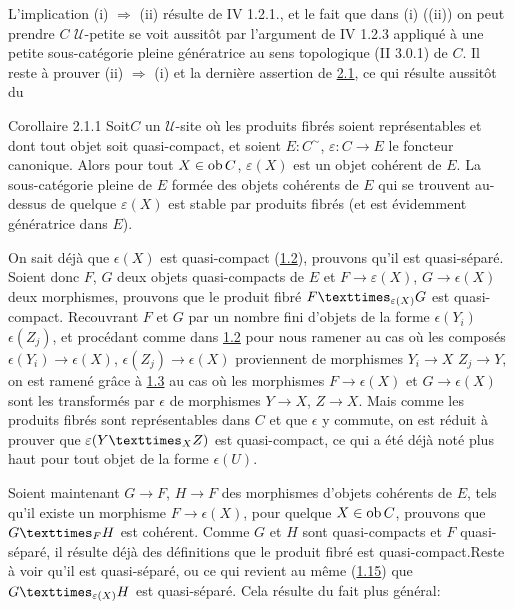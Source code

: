 \documentclass[10pt]{../fichiers-configuration-latex/smfart}
\begin{document}
L'implication (i) $\Rightarrow$ (ii) résulte de IV 1.2.1., et le
fait que dans (i) (\resp (ii)) on peut prendre $C$ $𝒰$-petite se voit
aussitôt par l'argument de IV 1.2.3 appliqué à une petite
sous-catégorie pleine génératrice au sens topologique (II 3.0.1) de
$C$. Il reste à prouver (ii) $\Rightarrow$ (i) et la dernière
assertion de \hyperref[VI.prop2.1]{2.1}, ce qui résulte aussitôt du

\begin{enonce*}{Corollaire 2.1.1}
Soit\pageoriginale $C$ un $𝒰$-site où les produits fibrés soient
représentables et dont tout objet soit quasi-compact, et soient $E : C^{\sim}$,
$\varepsilon : C \to E$ le foncteur canonique. Alors pour tout $X \in
\operatorname{ob} C$, $\varepsilon(X)$ est un objet cohérent de $E$. La
sous-catégorie pleine de $E$ formée des objets cohérents de $E$ qui se
trouvent au-dessus de quelque $\varepsilon(X)$ est stable par produits
fibrés (et est évidemment génératrice dans $E$).
\end{enonce*}

On sait déjà que $\epsilon(X)$ est quasi-compact (\hyperref[VI.prop1.2]{1.2}),
prouvons qu'il est quasi-séparé. Soient donc $F$, $G$ deux objets
quasi-compacts de $E$ et $F \to \varepsilon(X)$, $G \to \epsilon(X)$
deux morphismes, prouvons que le produit fibré
$\fprod{F}{G}{\epsilon(X)}$ est quasi-compact. Recouvrant $F$ et $G$
par un nombre fini d'objets de la forme $\epsilon(Y_i)$ \resp
$\epsilon(Z_j)$, et procédant comme dans \hyperref[VI.prop1.2]{1.2} pour nous
ramener au cas où les composés $\epsilon(Y_i) \to \epsilon(X)$,
$\epsilon(Z_j) \to \epsilon(X)$ proviennent de morphismes $Y_i \to
X$ \resp $Z_j \to Y$, on est ramené grâce à \hyperref[VI.prop1.3]{1.3} au cas
où les morphismes $F \to \epsilon(X)$ et $G \to \epsilon(X)$
sont les transformés par $\epsilon$ de morphismes $Y \to X$, $Z \to
X$. Mais comme les produits fibrés sont représentables dans $C$ et
que $\epsilon$ y commute, on est réduit à prouver que
$\epsilon(\fprod{Y}{Z}{X})$ est quasi-compact, ce qui a été déjà
noté plus haut pour tout objet de la forme $\epsilon(U)$.

Soient maintenant $G \to F$, $H \to F$ des morphismes d'objets
cohérents de $E$, tels qu'il existe un morphisme $F \to
\epsilon(X)$, pour quelque $X \in \operatorname{ob} C$, prouvons que
$\fprod{G}{H}{F}$ est cohérent. Comme $G$ et $H$ sont quasi-compacts
et $F$ quasi-séparé, il résulte déjà des définitions que le produit
fibré est quasi-compact.\pageoriginale Reste à voir qu'il est
quasi-séparé, ou ce qui revient au même (\hyperref[VI.cor1.15]{1.15}) que $\fprod{G}{H}{\epsilon(X)}$ est
quasi-séparé. Cela résulte du fait plus général:
\end{document}
